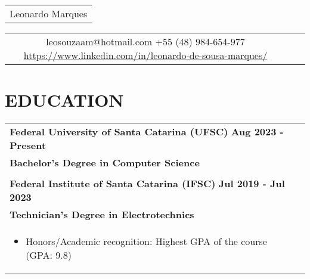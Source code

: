 \documentclass[a4paper,8pt]{article}
\begin{document}
\pagestyle{empty} 

\begin{tabularx}{\linewidth}{@{} C @{}}
\Huge{Leonardo Marques} \\[6pt]
\end{tabularx}

\begin{tabularx}{\linewidth}{@{} C @{} C @{} C}
{{\raisebox{-0.05\height}{\faEnvelope} leosouzaam@hotmail.com}} 
{{\raisebox{-0.05\height}{\faMobile} +55 (48) 984-654-977}} 
{{\href{https://www.linkedin.com/in/nameisjamiele}{\raisebox{-0.05\height}{\faLinkedin} https://www.linkedin.com/in/leonardo-de-sousa-marques/}}}
\end{tabularx}

\section{\textbf{EDUCATION}}
\begin{tabularx}{\linewidth}{ @{}l r@{}}
\textbf{Federal University of Santa Catarina (UFSC)} \hfill \textbf{Aug 2023 - Present} \\[4pt]
\textbf{Bachelor's Degree in Computer Science}\\[0.5pt]
\\ 
\textbf{Federal Institute of Santa Catarina (IFSC)} \hfill \textbf{Jul 2019 - Jul 2023}\\[4pt]
\textbf{Technician's Degree in Electrotechnics}\\[4pt]
\begin{minipage}[t]{\linewidth}
    \begin{itemize}[nosep, after=\strut, leftmargin=1em, itemsep=2pt]
        \item Honors/Academic recognition: Highest GPA of the course (GPA: 9.8)
    \end{itemize}
\end{minipage}
\end{tabularx}

\end{document}
